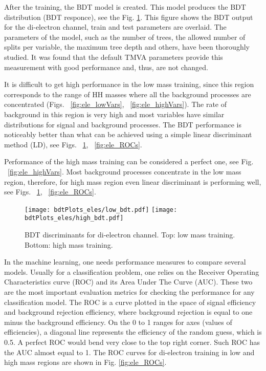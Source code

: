 After the training, the BDT model is created. This model produces the BDT distribution (BDT responce), see the Fig. \ref{fig:ele_BDTs}. This figure shows the BDT output for the di-electron channel, train and test parameters are overlaid. The parameters of the model, such as the number of trees, the allowed number of splits per variable, the maximum tree depth and others, have been thoroughly studied. It was found that the default TMVA parameters provide this measurement with good performance and, thus, are not changed.

It is difficult to get high performance in the low mass training, since
this region corresponds to the range of HH masses where all the background processes are concentrated (Figs. ~\ref{fig:ele_lowVars}, ~\ref{fig:ele_highVars}). The rate of background in this region is very high and most variables have similar distributions for signal and background processes. The BDT performance is noticeably better than what can be achieved using a simple linear discriminant method (LD), see Figs. ~\ref{fig:ele_BDTs}, ~\ref{fig:ele_ROCs}.

Performance of the high mass training can be considered a perfect one, see Fig. ~\ref{fig:ele_highVars}. Most background processes concentrate in the low mass region, therefore, for high mass region even linear
discriminant is performing well, see Figs. ~\ref{fig:ele_BDTs}, ~\ref{fig:ele_ROCs}.

\begin{figure}[H]
  \begin{center}
   \texttt{[image: bdtPlots\_eles/low\_bdt.pdf]}
   \texttt{[image: bdtPlots\_eles/high\_bdt.pdf]}
    \caption{ BDT discriminants for di-electron channel. Top: low mass training. Bottom: high mass training. }
    \label{fig:ele_BDTs}
  \end{center}
\end{figure}

In the machine learning, one needs performance measures to compare several models. Usually for a classification problem, one relies on the Receiver Operating Characteristics curve (ROC) and its Area Under The Curve (AUC). These two are the most important evaluation metrics for checking the performance for any classification model. The ROC is a curve plotted in the space of signal efficiency and background rejection efficiency, where background rejection is equal to one minus the background efficiency. On the 0 to 1 ranges for axes (values of efficiencies), a diagonal line represents the efficiency of the random guess, which is 0.5. A perfect ROC would bend very close to the top right corner. Such ROC has the AUC almost equal to 1. The ROC curves for di-electron training in low and high mass regions are shown in Fig. \ref{fig:ele_ROCs}. 
                      
